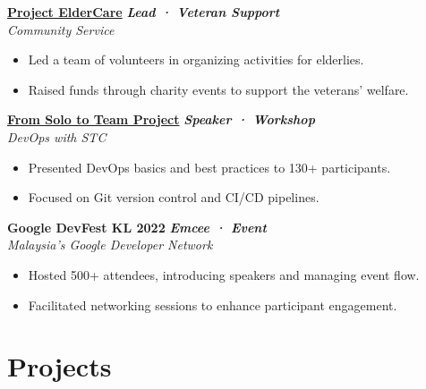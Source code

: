 \documentclass[letterpaper,10pt]{article}
\newcommand{\heading}[2]{
  \hspace{4pt}#1\hfill#2\\
}
\newcommand{\headingBf}[2]{
  \heading{\textbf{#1}}{
    \textbf{\textit{\small{#2}}}
  }
}
\newenvironment{bulletList}{
  \begin{itemize}[itemsep=1pt, parsep=1pt, leftmargin=26pt]
}{
  \end{itemize}
}
\newcommand{\oneFrag}[4]{
  \headingBf{#1}{#2}
  \hspace{6pt}\textit{#3}
  \vspace{-4pt}
  #4
}
\begin{document}
\vspace{2pt}
\oneFrag{
  \href{https://linktr.ee/project.eldercare}{Project ElderCare}
}{
  Lead · Veteran Support
}{
  Community Service
}{
  \begin{bulletList}
    \item Led a team of volunteers in organizing activities for elderlies.
    \item Raised funds through charity events to support the veterans' welfare.
  \end{bulletList}
}


\vspace{2pt}
\oneFrag{
  \href{https://www.linkedin.com/feed/update/urn:li:activity:7146880139035852800}{From Solo to Team Project}
}{
  Speaker · Workshop
}{
  DevOps with STC
}{
  \begin{bulletList}
    \item Presented DevOps basics and best practices to 130+ participants.
    \item Focused on Git version control and CI/CD pipelines.
  \end{bulletList}
}

\vspace{2pt}
\oneFrag{
  Google DevFest KL 2022
}{
  Emcee · Event
}{
  Malaysia's Google Developer Network
}{
  \begin{bulletList}
    \item Hosted 500+ attendees, introducing speakers and managing event flow.
    \item Facilitated networking sessions to enhance participant engagement.
  \end{bulletList}
}

\newpage


\section{Projects}
\end{document}
